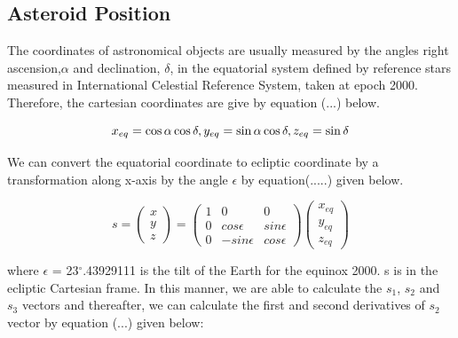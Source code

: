 \documentclass[letterpaper,12pt]{article}
\begin{document}
\subsection{Asteroid Position}
The coordinates of astronomical objects are usually measured by the angles right ascension,\begin{math}\alpha \end{math} and declination, \begin{math} \delta \end{math}, in the equatorial system defined by reference stars measured in International Celestial Reference System, taken at epoch 2000. Therefore, the cartesian coordinates are give by equation (...) below.

\begin{equation}
x_{eq}=\cos\alpha \cos\delta, \\ 
y_{eq}=\sin\alpha \cos\delta , \\ 
z_{eq}=\sin\delta
\end{equation}

We can convert the equatorial coordinate to ecliptic coordinate by a transformation along x-axis by the angle \begin{math} \epsilon \end{math} by equation(.....) given below.

\begin{equation}
s=
\begin{pmatrix}
  x \\
  y \\
  z
 \end{pmatrix} 
  =
\begin{pmatrix}
1 & 0 & 0 \\ 
 0 & cos\epsilon & sin\epsilon\\ 
 0 & -sin\epsilon & cos\epsilon
\end{pmatrix}
\begin{pmatrix}
  x_{eq} \\
  y_{eq} \\
  z_{eq}
\end{pmatrix} 
\end{equation}

where \begin{math}\epsilon\end{math} = 23\begin{math} ^{\circ} \end{math}.43929111 is the tilt of the Earth for the equinox 2000. s is in the ecliptic Cartesian frame.
In this manner, we are able to calculate the \begin{math}s_{1}\end{math}, \begin{math}s_{2}\end{math} and \begin{math}s_{3}\end{math} vectors and thereafter, we can calculate the first and second derivatives of \begin{math} s_{2} \end{math} vector by equation (...) given below:
\end{document}

